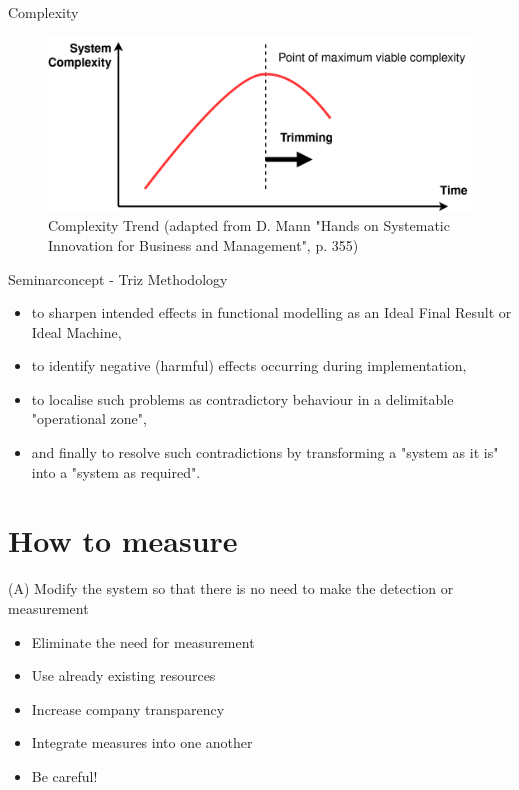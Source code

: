 \documentclass{beamer}
\begin{document}
	\begin{frame}{Complexity}
		\begin{figure}
			\centering
			\includegraphics[width=\textwidth]{img/complexity2.png}
			\caption{Complexity Trend (adapted from D. Mann "Hands on Systematic Innovation for Business and Management", p. 355)}
		\end{figure}
	\end{frame}

	\begin{frame}{Seminarconcept - Triz Methodology}
		\begin{itemize}
			\item to sharpen intended effects in functional modelling as an Ideal Final
			Result or Ideal Machine,
			\item to identify negative (harmful) effects occurring during implementation, 
			\item to localise such problems as contradictory behaviour in a delimitable
			"operational zone", 
			\item and finally to resolve such contradictions by transforming a "system as
			it is" into a "system as required".
		\end{itemize}
	\end{frame}
	
	\section{How to measure}
	

	\begin{frame}{(A) Modify the system so that there is no need to make the detection or measurement}
		\begin{itemize}
			\item Eliminate the need for measurement
			\item Use already existing resources
			\item Increase company transparency
			\item Integrate measures into one another
			\item Be careful!
		\end{itemize}
	\end{frame}
\end{document}
